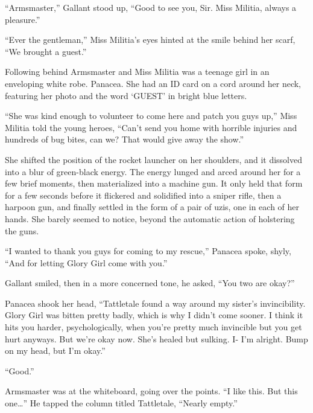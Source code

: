 ``Armsmaster,'' Gallant stood up, ``Good to see you, Sir.  Miss Militia, always a pleasure.''



``Ever the gentleman,'' Miss Militia's eyes hinted at the smile behind her scarf, ``We brought a guest.''



Following behind Armsmaster and Miss Militia was a teenage girl in an enveloping white robe.  Panacea.  She had an ID card on a cord around her neck, featuring her photo and the word `GUEST' in bright blue letters.



``She was kind enough to volunteer to come here and patch you guys up,'' Miss Militia told the young heroes, ``Can't send you home with horrible injuries and hundreds of bug bites, can we?  That would give away the show.''



She shifted the position of the rocket launcher on her shoulders, and it dissolved into a blur of green-black energy.  The energy lunged and arced around her for a few brief moments, then materialized into a machine gun.  It only held that form for a few seconds before it flickered and solidified into a sniper rifle, then a harpoon gun, and  finally settled in the form of a pair of uzis, one in each of her hands.  She barely seemed to notice, beyond the automatic action of holstering the guns.



``I wanted to thank you guys for coming to my rescue,'' Panacea spoke, shyly, ``And for letting Glory Girl come with you.''



Gallant smiled, then in a more concerned tone, he asked, ``You two are okay?''



Panacea shook her head, ``Tattletale found a way around my sister's invincibility.  Glory Girl was bitten pretty badly, which is why I didn't come sooner.  I think it hits you harder, psychologically, when you're pretty much invincible but you get hurt anyways.  But we're okay now.  She's healed but sulking.  I- I'm alright.  Bump on my head, but I'm okay.''



``Good.''



Armsmaster was at the whiteboard, going over the points.  ``I like this.  But this one\ldots''  He tapped the column titled Tattletale, ``Nearly empty.''



